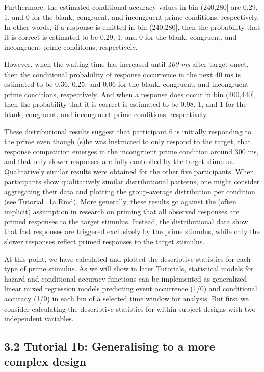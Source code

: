 \documentclass[
  man, donotrepeattitle,floatsintext]{apa6}
\begin{document}
Furthermore, the estimated conditional accuracy values in bin (240,280{]} are 0.29, 1, and 0 for the blank, congruent, and incongruent prime conditions, respectively. In other words, if a response is emitted in bin (240,280{]}, then the probability that it is correct is estimated to be 0.29, 1, and 0 for the blank, congruent, and incongruent prime conditions, respectively.

However, when the waiting time has increased until \emph{400 ms} after target onset, then the conditional probability of response occurrence in the next 40 ms is estimated to be 0.36, 0.25, and 0.06 for the blank, congruent, and incongruent prime conditions, respectively. And when a response does occur in bin (400,440{]}, then the probability that it is correct is estimated to be 0.98, 1, and 1 for the blank, congruent, and incongruent prime conditions, respectively.

These distributional results suggest that participant 6 is initially responding to the prime even though (s)he was instructed to only respond to the target, that response competition emerges in the incongruent prime condition around 300 ms, and that only slower responses are fully controlled by the target stimulus. Qualitatively similar results were obtained for the other five participants. When participants show qualitatively similar distributional patterns, one might consider aggregating their data and plotting the group-average distribution per condition (see Tutorial\_1a.Rmd). More generally, these results go against the (often implicit) assumption in research on priming that all observed responses are primed responses to the target stimulus. Instead, the distributional data show that fast responses are triggered exclusively by the prime stimulus, while only the slower responses reflect primed responses to the target stimulus.

At this point, we have calculated and plotted the descriptive statistics for each type of prime stimulus. As we will show in later Tutorials, statistical models for hazard and conditional accuracy functions can be implemented as generalized linear mixed regression models predicting event occurrence (1/0) and conditional accuracy (1/0) in each bin of a selected time window for analysis. But first we consider calculating the descriptive statistics for within-subject designs with two independent variables.

\subsection{3.2 Tutorial 1b: Generalising to a more complex design}\label{tutorial-1b-generalising-to-a-more-complex-design}
\end{document}
